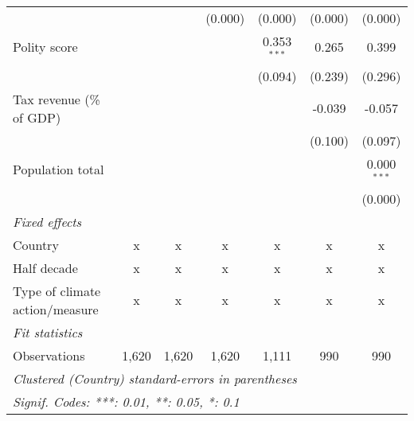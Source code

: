 \begin{tabular}{lcccccc}
                                                                                  &                &                & (0.000)        & (0.000)       & (0.000)       & (0.000)\\   
   Polity score                                                                   &                &                &                & 0.353$^{***}$ & 0.265         & 0.399\\   
                                                                                  &                &                &                & (0.094)       & (0.239)       & (0.296)\\   
   Tax revenue (\% of GDP)                                                        &                &                &                &               & -0.039        & -0.057\\   
                                                                                  &                &                &                &               & (0.100)       & (0.097)\\   
   Population total                                                               &                &                &                &               &               & 0.000$^{***}$\\   
                                                                                  &                &                &                &               &               & (0.000)\\   
   \emph{Fixed effects}\\
   Country                                                                        & x              & x              & x              & x             & x             & x\\  
   Half decade                                                                    & x              & x              & x              & x             & x             & x\\  
   Type of climate action/measure                                                 & x              & x              & x              & x             & x             & x\\  
   \midrule \emph{Fit statistics}\\
   Observations                                                                   & 1,620          & 1,620          & 1,620          & 1,111         & 990           & 990\\  
   \midrule
   \multicolumn{7}{l}{\emph{Clustered (Country) standard-errors in parentheses}}\\
   \multicolumn{7}{l}{\emph{Signif. Codes: ***: 0.01, **: 0.05, *: 0.1}}\\
\end{tabular}
\par\endgroup


